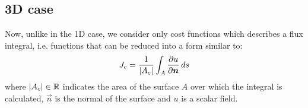 




\subsection{3D case}
\label{subsec:adjoint_method_RBF-FD_3D}

Now, unlike in the 1D case, we consider only cost functions which describes a flux integral, i.e. functions that can be reduced into a form similar to:
\begin{equation}
	\label{eqn:continuous_3D_cost_function}
	J_c = \frac{1}{\lvert A_c\rvert} \int_A \frac{\partial u}{\partial \boldsymbol{n}} \, ds
\end{equation}
where $\lvert A_c\rvert \in \mathbb{R}$ indicates the area of the surface $A$ over which the integral is calculated, $\vec{n}$ is the normal of the surface and $u$ is a scalar field.

